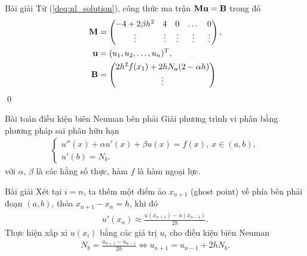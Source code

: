 \documentclass[9pt]{beamer}
\numberwithin{equation}{section}
\begin{document}
\begin{frame}
\begin{exampleblock}{Bài giải}
    Từ (\ref{deq:nl_solution}), công thức ma trận ${\bf M} {\bf u} = {\bf B}$ trong đó
    \begin{align*}
        {\bf M} &= \begin{pmatrix}
            -4 + 2\beta h^2 & 4 & 0 & \dots & 0 \\
            \vdots & \vdots & \vdots & \vdots & \vdots
        \end{pmatrix}, \\
        {\bf u} &= (u_1, u_2, \dots, u_n)^T, \\
        {\bf B} &= \begin{pmatrix}
            2h^2 f(x_1) + 2h N_a (2 - \alpha h) \\
            \vdots
        \end{pmatrix}
    \end{align*} \hfill \qed
\end{exampleblock}
\end{frame}

\begin{frame}
\begin{block}{Bài toán điều kiện biên Neuman bên phải}
    Giải phương trình vi phân bằng phương pháp sai phân hữu hạn
    \begin{align*}
        \begin{cases}
        u''(x) + \alpha u'(x) + \beta u(x) = f(x), \ x \in (a,b), \\
        u'(b) = N_b.
        \end{cases}
    \end{align*}
    với $\alpha$, $\beta$ là các hằng số thực, hàm $f$ là hàm ngoại lực.
\end{block}

\begin{exampleblock}{Bài giải}
    Xét tại $i = n$, ta thêm một điểm ảo $x_{n+1}$ (ghost point) về phía bên phải đoạn $(a,b)$, thỏa $x_{n+1} - x_n = h$, khi đó
    \begin{align*}
        u'(x_n) \approx \frac{u(x_{n+1}) - u(x_{n-1})}{2h}.
    \end{align*}
    Thực hiện xấp xỉ $u(x_i)$ bằng các giá trị $u_i$ cho điều kiện biên Neuman
    \begin{align*}
        N_b = \frac{u_{n+1} - u_{n-1}}{2h} \Leftrightarrow u_{n+1} = u_{n-1} + 2h N_b.
    \end{align*}
\end{exampleblock}
\end{frame}
\end{document}
